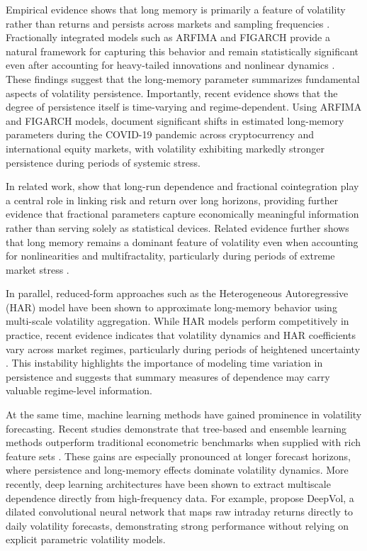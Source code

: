 \documentclass[12pt,a4paper]{article}
\begin{document}
\vspace{0.3cm}
\noindent
Empirical evidence shows that long memory is primarily a feature of volatility rather than returns and persists across markets and sampling frequencies
\citep{he2025lrd, baillie2019longmemory}. Fractionally integrated models such as ARFIMA and FIGARCH provide a natural framework for capturing this behavior and remain statistically significant even after accounting for heavy-tailed innovations and nonlinear dynamics \citep{he2025lrd}. These findings suggest that the long-memory parameter summarizes fundamental aspects of volatility persistence. Importantly, recent evidence shows that the degree of persistence itself is time-varying and regime-dependent. Using ARFIMA and FIGARCH models, \citet{lahmiri2021covid} document significant shifts in estimated long-memory parameters during the COVID-19 pandemic across cryptocurrency and international equity markets, with volatility exhibiting markedly stronger persistence during periods of systemic stress.

\vspace{0.3cm}
\noindent
In related work, \citet{bollerslev2016risk} show that long-run dependence and fractional cointegration play a central role in linking risk and return over long horizons, providing further evidence that fractional parameters capture economically meaningful information rather than serving solely as statistical devices.
Related evidence further shows that long memory remains a dominant feature of volatility even when accounting for nonlinearities and multifractality, particularly during periods of extreme market stress \citep{lahmiri2023extreme}.


\vspace{0.3cm}
\noindent
In parallel, reduced-form approaches such as the Heterogeneous Autoregressive (HAR) model have been shown to approximate long-memory behavior using multi-scale volatility aggregation. While HAR models perform competitively in practice, recent evidence indicates that volatility dynamics and HAR coefficients vary across market regimes, particularly during periods of heightened uncertainty \citep{blake2025regime}. This instability highlights the importance of modeling time variation in persistence and suggests that summary measures of dependence may carry valuable regime-level information.

\vspace{0.3cm}
\noindent
At the same time, machine learning methods have gained prominence in volatility forecasting. Recent studies demonstrate that tree-based and ensemble learning methods outperform traditional econometric benchmarks when supplied with rich feature sets
\citep{omer2026mlrv, zhang2024intraday}. These gains are especially pronounced at longer forecast horizons, where persistence and long-memory effects dominate volatility dynamics. More recently, deep learning architectures have been shown to extract multiscale dependence directly from high-frequency data. For example, \citet{moreno2024deepvol} propose DeepVol, a dilated convolutional neural network that maps raw intraday returns directly to daily volatility forecasts, demonstrating strong performance without relying on explicit parametric volatility models.
\end{document}
